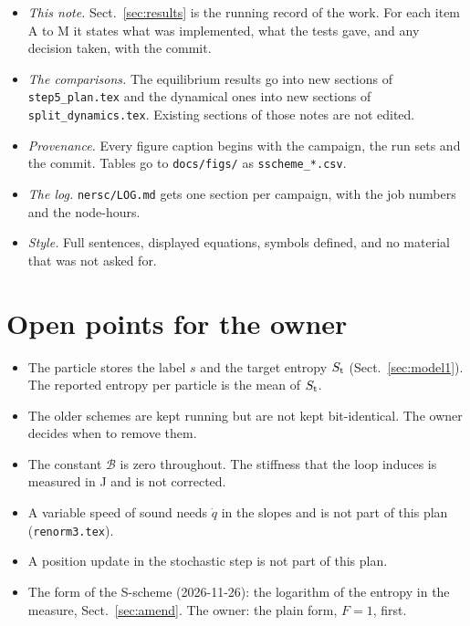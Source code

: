 \documentclass[11pt,aps,preprint,nofootinbib,superscriptaddress,tightenlines]{revtex4-2}
\def\Sect#1{Sect.~\ref{#1}}
\begin{document}
\begin{itemize}
\item \emph{This note.}  \Sect{sec:results} is the running record of the work.  For each item A to M it states what was implemented, what the tests
  gave, and any decision taken, with the commit.
\item \emph{The comparisons.}  The equilibrium results go into new sections of \nolinkurl{step5_plan.tex} and the dynamical ones into new sections of
  \nolinkurl{split_dynamics.tex}.  Existing sections of those notes are not edited.
\item \emph{Provenance.}  Every figure caption begins with the campaign, the run sets and the commit.  Tables go to \nolinkurl{docs/figs/} as
  \texttt{sscheme\_*.csv}.
\item \emph{The log.}  \nolinkurl{nersc/LOG.md} gets one section per campaign, with the job numbers and the node-hours.
\item \emph{Style.}  Full sentences, displayed equations, symbols defined, and no material that was not asked for.
\end{itemize}

\section{Open points for the owner}
\label{sec:open}

\begin{itemize}
\item The particle stores the label $s$ and the target entropy $S_{\rm t}$ (\Sect{sec:model1}).  The reported entropy per particle is the mean of
  $S_{\rm t}$.
\item The older schemes are kept running but are not kept bit-identical.  The owner decides when to remove them.
\item The constant $\mathcal B$ is zero throughout.  The stiffness that the loop induces is measured in J and is not corrected.
\item A variable speed of sound needs $\dot q$ in the slopes and is not part of this plan (\nolinkurl{renorm3.tex}).
\item A position update in the stochastic step is not part of this plan.
\item The form of the S-scheme (2026-11-26): the logarithm of the entropy in the measure, \Sect{sec:amend}.  The owner: the plain form, $F=1$, first.
\end{itemize}
\end{document}
